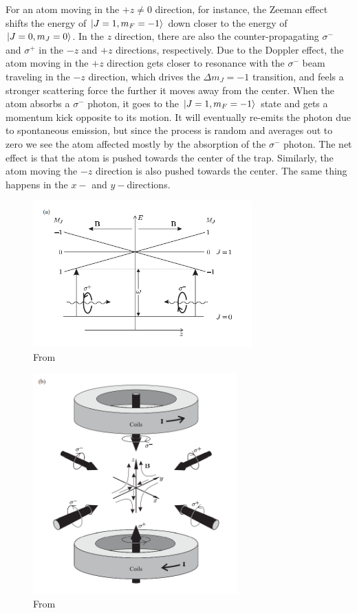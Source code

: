 \documentclass{book}
\theoremstyle{definition}
\begin{document}
For an atom moving in the $+z \neq 0$ direction, for instance, the Zeeman effect shifts the energy of $\ket{J=1,m_F=-1}$ down closer to the energy of $\ket{J=0,m_J=0}$. In the $z$ direction, there are also the counter-propagating $\sigma^-$ and $\sigma^+$ in the $- z$ and $+z$ directions, respectively. Due to the Doppler effect, the atom moving in the $+z$ direction gets closer to resonance with the $\sigma^-$ beam traveling in the $-z$ direction, which drives the $\Delta m_J = -1$ transition, and feels a stronger scattering force the further it moves away from the center. When the atom absorbs a $\sigma^-$ photon, it goes to the $\ket{J=1,m_F=-1}$ state and gets a momentum kick opposite to its motion. It will eventually re-emits the photon due to spontaneous emission, but since the process is random and averages out to zero we see the atom affected mostly by the absorption of the $\sigma^-$ photon. The net effect is that the atom is pushed towards the center of the trap. Similarly, the atom moving the $-z$ direction is also pushed towards the center. The same thing happens in the $x-$ and $y-$directions.  
 	
 	
\begin{figure}[!htb]
	\centering
	\includegraphics[width=0.75\textwidth]{images/foot_1}
	\caption{From \cite{foot2005atomic}}
\end{figure}

\begin{figure}[!htb]
	\centering
	\includegraphics[width=0.7\textwidth]{images/foot_2}
	\caption{From \cite{foot2005atomic}}
\end{figure}
\end{document}
